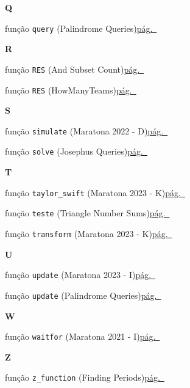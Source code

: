 \documentclass[10pt, a4paper, twocolumn, landscape]{article}
\begin{document}
{\par\medskip\textbf{\large Q}\par
\noindent função \texttt{query} {\scriptsize\color{codegray}(Palindrome Queries)}\dotfill\hyperref[fn57]{pág.~\pageref*{fn57}}\par
\par\medskip\textbf{\large R}\par
\noindent função \texttt{RES} {\scriptsize\color{codegray}(And Subset Count)}\dotfill\hyperref[fn64]{pág.~\pageref*{fn64}}\par
\noindent função \texttt{RES} {\scriptsize\color{codegray}(HowManyTeams)}\dotfill\hyperref[fn84]{pág.~\pageref*{fn84}}\par
\par\medskip\textbf{\large S}\par
\noindent função \texttt{simulate} {\scriptsize\color{codegray}(Maratona 2022 - D)}\dotfill\hyperref[fn94]{pág.~\pageref*{fn94}}\par
\noindent função \texttt{solve} {\scriptsize\color{codegray}(Josephus Queries)}\dotfill\hyperref[fn45]{pág.~\pageref*{fn45}}\par
\par\medskip\textbf{\large T}\par
\noindent função \texttt{taylor\_swift} {\scriptsize\color{codegray}(Maratona 2023 - K)}\dotfill\hyperref[fn41]{pág.~\pageref*{fn41}}\par
\noindent função \texttt{teste} {\scriptsize\color{codegray}(Triangle Number Sums)}\dotfill\hyperref[fn83]{pág.~\pageref*{fn83}}\par
\noindent função \texttt{transform} {\scriptsize\color{codegray}(Maratona 2023 - K)}\dotfill\hyperref[fn39]{pág.~\pageref*{fn39}}\par
\par\medskip\textbf{\large U}\par
\noindent função \texttt{update} {\scriptsize\color{codegray}(Maratona 2023 - I)}\dotfill\hyperref[fn37]{pág.~\pageref*{fn37}}\par
\noindent função \texttt{update} {\scriptsize\color{codegray}(Palindrome Queries)}\dotfill\hyperref[fn56]{pág.~\pageref*{fn56}}\par
\par\medskip\textbf{\large W}\par
\noindent função \texttt{waitfor} {\scriptsize\color{codegray}(Maratona 2021 - I)}\dotfill\hyperref[fn93]{pág.~\pageref*{fn93}}\par
\par\medskip\textbf{\large Z}\par
\noindent função \texttt{z\_function} {\scriptsize\color{codegray}(Finding Periods)}\dotfill\hyperref[fn33]{pág.~\pageref*{fn33}}\par
}
\end{document}
